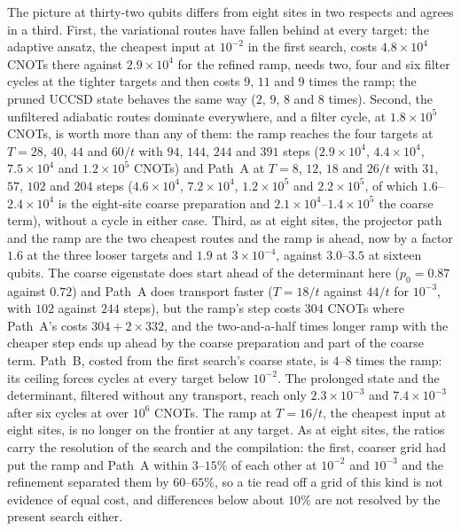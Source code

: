 \documentclass[a4paper,11pt,noarxiv]{quantumarticle}
\begin{document}
The picture at thirty-two qubits differs from eight sites in two respects
and agrees in a third.  First, the variational routes have fallen behind
at every target: the adaptive ansatz, the cheapest input at $10^{-2}$ in
the first search, costs $4.8\times10^4$ CNOTs there against
$2.9\times10^4$ for the refined ramp, needs two, four and six filter
cycles at the tighter targets and then costs $9$, $11$ and $9$ times the
ramp; the pruned UCCSD state behaves the same way ($2$, $9$, $8$ and $8$
times).  Second, the unfiltered adiabatic routes dominate everywhere, and a
filter cycle, at $1.8\times10^5$ CNOTs, is worth more than any of them:
the ramp reaches the four targets at $T=28$, $40$, $44$ and $60/t$ with
$94$, $144$, $244$ and $391$ steps ($2.9\times10^4$, $4.4\times10^4$,
$7.5\times10^4$ and $1.2\times10^5$ CNOTs) and Path~A at $T=8$, $12$, $18$
and $26/t$ with $31$, $57$, $102$ and $204$ steps ($4.6\times10^4$,
$7.2\times10^4$, $1.2\times10^5$ and $2.2\times10^5$, of which
$1.6$--$2.4\times10^4$ is the eight-site coarse preparation and
$2.1\times10^4$--$1.4\times10^5$ the coarse term), without a cycle in
either case.  Third, as at eight sites, the projector path and the ramp
are the two cheapest routes and the ramp is ahead, now by a factor $1.6$
at the three looser targets and $1.9$ at $3\times10^{-4}$, against
$3.0$--$3.5$ at sixteen qubits.  The coarse eigenstate does start ahead of
the determinant here ($p_0=0.87$ against $0.72$) and Path~A does transport
faster ($T=18/t$ against $44/t$ for $10^{-3}$, with $102$ against $244$
steps), but the ramp's step costs $304$ CNOTs where Path~A's costs
$304+2\times332$, and the two-and-a-half times longer ramp with the
cheaper step ends up ahead by the coarse preparation and part of the
coarse term.  Path~B, costed from the first search's coarse state, is
$4$--$8$ times the ramp: its ceiling forces cycles at every target below
$10^{-2}$.  The prolonged state and the determinant, filtered without any
transport, reach only $2.3\times10^{-3}$ and $7.4\times10^{-3}$ after six
cycles at over $10^6$ CNOTs.  The ramp at $T=16/t$, the cheapest input at
eight sites, is no longer on the frontier at any target.  As at eight
sites, the ratios carry the resolution of the search and the
compilation: the first, coarser grid had put the ramp and Path~A within
$3$--$15\%$ of each other at $10^{-2}$ and $10^{-3}$ and the refinement
separated them by $60$--$65\%$, so a tie read off a grid of this kind is
not evidence of equal cost, and differences below about $10\%$ are not
resolved by the present search either.
\end{document}
